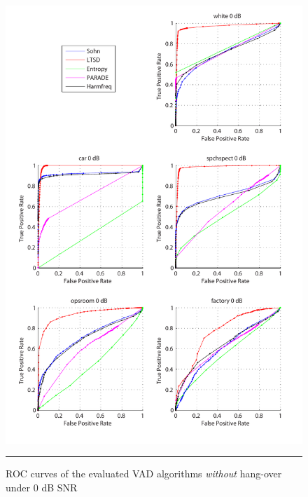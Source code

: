 \begin{figure}[htbp]
	\centering
		\includegraphics[width=1.0\columnwidth]{Figures/Chapter3/0dBnoh.pdf}
		\rule{37em}{0.5pt}
	\caption[ROC curves of the evaluated algorithms \emph{without} hang-over under 0 dB SNR]{ROC curves of the evaluated VAD algorithms \emph{without} hang-over under 0 dB SNR}
	\label{fig:0dBnoh}
\end{figure}